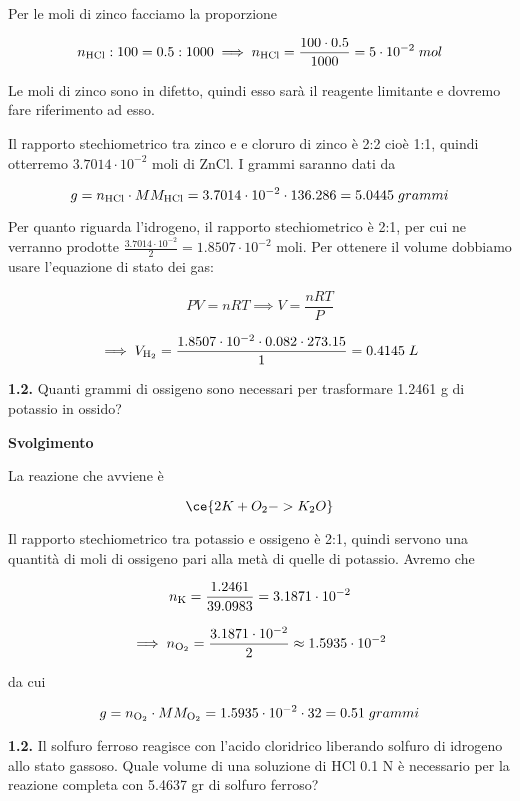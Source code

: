 Per le moli di zinco facciamo la proporzione

$$n_{\rm HCl}:100=0.5:1000
\implies
n_{\rm HCl}=\frac{100 \cdot 0.5}{1000}=5 \cdot 10^{-2}\;mol$$

Le moli di zinco sono in difetto, quindi esso sarà il reagente limitante e dovremo fare riferimento ad esso.

Il rapporto stechiometrico tra zinco e e cloruro di zinco è 2:2 cioè 1:1, quindi otterremo $3.7014 \cdot 10^{-2}$ moli di ZnCl. I grammi saranno dati da

$$g=n_{\rm HCl} \cdot MM_{\rm HCl}=3.7014 \cdot 10^{-2} \cdot 136.286=5.0445\;grammi$$

Per quanto riguarda l'idrogeno, il rapporto stechiometrico è 2:1, per cui ne verranno prodotte $\frac{3.7014 \cdot 10^{-2}}{2}=1.8507 \cdot 10^{-2}$ moli. Per ottenere il volume dobbiamo usare l'equazione di stato dei gas:

$$PV=nRT \implies V=\frac{nRT}{P}$$

$$\implies V_{\rm H_2}
=\frac{1.8507 \cdot 10^{-2} \cdot 0.082 \cdot 273.15}{1}
=0.4145\;L$$

\vspace{0.2cm}\textbf{1.2.} Quanti grammi di ossigeno sono necessari per trasformare 1.2461 g di potassio in ossido?

\vspace{0.2cm}\large\textbf{Svolgimento}\normalsize

\vspace{0.2cm}La reazione che avviene è

$$\ce{2K + O_2 -> K_2O}$$

Il rapporto stechiometrico tra potassio e ossigeno è 2:1, quindi servono una quantità di moli di ossigeno pari alla metà di quelle di potassio. Avremo che

$$n_{\rm K}=\frac{1.2461}{39.0983}=3.1871 \cdot 10^{-2}$$

$$\implies n_{\rm O_2}
=\frac{3.1871 \cdot 10^{-2}}{2}
\approx 1.5935 \cdot 10^{-2}$$

da cui

$$g=n_{\rm O_2} \cdot MM_{\rm O_2}
=1.5935 \cdot 10^{-2} \cdot 32=0.51\;grammi$$

\vspace{0.2cm}\textbf{1.2.} Il solfuro ferroso reagisce con l'acido cloridrico liberando solfuro di idrogeno allo stato gassoso. Quale volume di una soluzione di HCl 0.1 N è necessario per la reazione completa con 5.4637 gr di solfuro ferroso?

